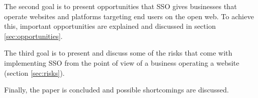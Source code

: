 The second goal is to present opportunities that \ac{SSO} gives businesses that operate websites and platforms
targeting end users on the open web. To achieve this, important opportunities are explained and discussed in section \ref{sec:opportunities}.

The third goal is to present and discuss some of the risks that come with implementing \ac{SSO} from the point of view of a
business operating a website (section \ref{sec:risks}).

Finally, the paper is concluded and possible shortcomings are discussed.